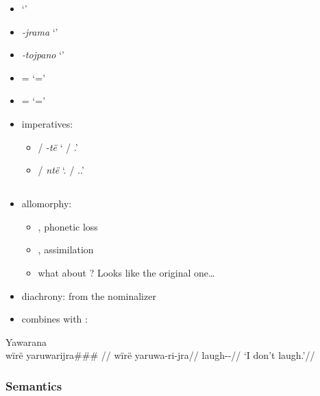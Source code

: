 \documentclass{memoir}
\begin{document}
\begin{itemize}
\item
   `'
\item
  \emph{‑jrama} `'
\item
  \emph{‑tojpano} `'
\item
  = `='
\item
  = `='
\item
  imperatives:

  \begin{itemize}
  \tightlist
  \item
     / ‑\emph{të} ` / .'
  \item
     / \emph{ntë} `. /
    ..'
  \end{itemize}
\end{itemize}

\subsection{\texorpdfstring{ \label{sec:riipfv}}{ }}

\begin{itemize}
\tightlist
\item
  allomorphy:

  \begin{itemize}
  \tightlist
  \item
    , phonetic loss
  \item
    , assimilation
  \item
    what about ? Looks like the original one\ldots{}
  \end{itemize}
\item
  diachrony: from the nominalizer 
\item
  combines with :
\end{itemize}

\ex Yawarana \\
\label{convrisamaj-04}    \begingl
    \glpreamble  wïrë yaruwarijra\#\#\# //
    \gla wïrë yaruwa-ri-jra//
    \glb {} laugh--//
        \glft ‘I don’t laugh.’//  
    \endgl 
\xe

\subsubsection{Semantics}
\end{document}
